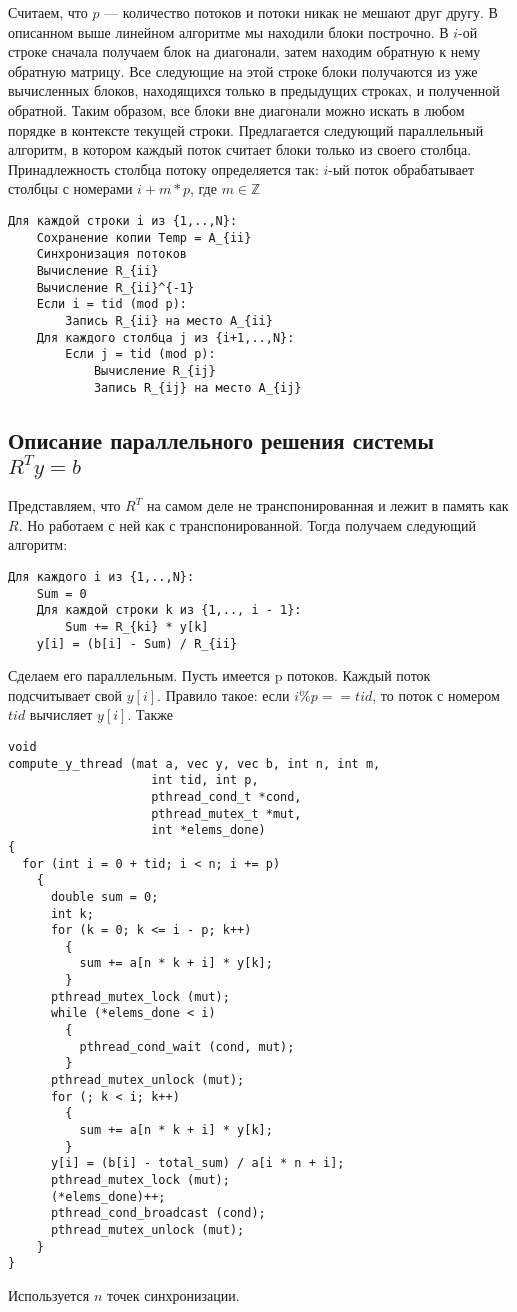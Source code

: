 \documentclass[a4paper, 12pt]{article}
\begin{document}
Считаем, что $p$ --- количество потоков и потоки никак не мешают друг другу.
В описанном выше линейном алгоритме мы находили блоки построчно.
В $i$-ой строке сначала получаем блок на диагонали,
затем находим обратную к нему обратную матрицу.
Все следующие на этой строке блоки получаются из уже вычисленных
блоков, находящихся только в предыдущих строках,
 и полученной обратной.
Таким образом, все блоки вне диагонали можно искать в 
любом порядке в контексте текущей строки.
\newline
Предлагается следующий параллельный алгоритм, в котором 
 каждый поток считает блоки только из 
 своего столбца.
Принадлежность столбца потоку определяется так:
 $i$-ый поток обрабатывает столбцы с номерами
 $i+m*p$, где $m \in \mathbb{Z}$
\begin{verbatim}
Для каждой строки i из {1,..,N}:
    Сохранение копии Temp = A_{ii}
    Синхронизация потоков
    Вычисление R_{ii}
    Вычисление R_{ii}^{-1}
    Если i = tid (mod p):
        Запись R_{ii} на место A_{ii}
    Для каждого столбца j из {i+1,..,N}:
        Если j = tid (mod p):
            Вычисление R_{ij}
            Запись R_{ij} на место A_{ij}
\end{verbatim}


\subsection{Описание параллельного решения системы $R^T y=b$}

Представляем, что $R^T$ на самом деле не транспонированная
и лежит в память как $R$. Но работаем с ней как с транспонированной.
Тогда получаем следующий алгоритм:
\begin{verbatim}
Для каждого i из {1,..,N}:
    Sum = 0
    Для каждой строки k из {1,.., i - 1}:
        Sum += R_{ki} * y[k]
    y[i] = (b[i] - Sum) / R_{ii}
\end{verbatim}

Сделаем его параллельным. Пусть имеется p потоков.          
Каждый поток подсчитывает свой $y[i]$. Правило такое: 
если $i \% p == tid$, то поток с номером $tid$ вычисляет
$y[i]$. Также 

\begin{verbatim}
void
compute_y_thread (mat a, vec y, vec b, int n, int m,
                    int tid, int p, 
                    pthread_cond_t *cond,
                    pthread_mutex_t *mut,
                    int *elems_done)
{
  for (int i = 0 + tid; i < n; i += p)
    {
      double sum = 0;
      int k;
      for (k = 0; k <= i - p; k++)
        {
          sum += a[n * k + i] * y[k];
        }
      pthread_mutex_lock (mut);
      while (*elems_done < i)
        {
          pthread_cond_wait (cond, mut);
        }
      pthread_mutex_unlock (mut);
      for (; k < i; k++)
        {
          sum += a[n * k + i] * y[k];
        }
      y[i] = (b[i] - total_sum) / a[i * n + i];
      pthread_mutex_lock (mut);
      (*elems_done)++;
      pthread_cond_broadcast (cond);
      pthread_mutex_unlock (mut);
    }
}
\end{verbatim}
Используется $n$ точек синхронизации.
\end{document}
